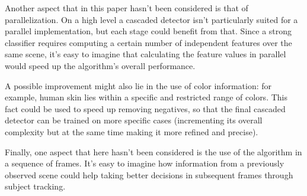 \documentclass[a4paper,11pt,titlepage]{article}
\begin{document}
Another aspect that in this paper hasn't been considered is that of
parallelization. On a high level a cascaded detector isn't particularly suited
for a parallel implementation, but each stage could benefit from that. Since a
strong classifier requires computing a certain number of independent features
over the same scene, it's easy to imagine that calculating the feature values in
parallel would speed up the algorithm's overall performance.

A possible improvement might also lie in the use of color information: for
example, human skin lies within a specific and restricted range of colors. This
fact could be used to speed up removing negatives, so that the final cascaded
detector can be trained on more specific cases (incrementing its overall
complexity but at the same time making it more refined and precise).

Finally, one aspect that here hasn't been considered is the use of the algorithm
in a sequence of frames. It's easy to imagine how information from a
previously observed scene could help taking better decisions in subsequent
frames through subject tracking.



\end{document}

